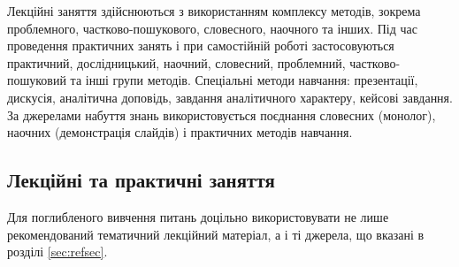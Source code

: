 \documentclass{Syllabus}
\begin{document}
Лекційні заняття здійснюються з використанням комплексу методів, зокрема проблемного, частково-пошукового, словесного, наочного та інших. Під час проведення практичних занять і при самостійній роботі застосовуються практичний, дослідницький, наочний, словесний, проблемний, частково-пошуковий та інші групи методів. Спеціальні методи навчання: презентації, дискусія, аналітична доповідь, завдання аналітичного характеру, кейсові завдання. За джерелами набуття знань використовується поєднання словесних (монолог), наочних (демонстрація слайдів) і практичних методів навчання.


\subsection*{Лекційні та практичні заняття}

Для поглибленого вивчення питань доцільно використовувати не лише рекомендований тематичний лекційний матеріал, а і ті джерела, що вказані в розділі \ref{sec:refsec}.
\end{document}
